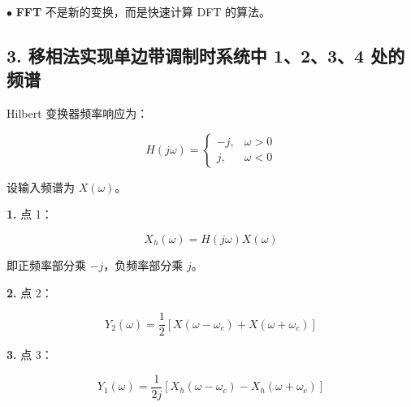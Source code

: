 \documentclass[11pt]{ctexart}
\begin{document}
\noindent\(\bullet\) \textbf{FFT} 不是新的变换，而是快速计算 DFT 的算法。\par



\subsection*{3. 移相法实现单边带调制时系统中 1、2、3、4 处的频谱}



Hilbert 变换器频率响应为：\par



\[

H(j\omega)=

\begin{cases}

-j, & \omega>0\\

j, & \omega<0

\end{cases}

\]



设输入频谱为 \(X(\omega)\)。\par



\noindent\textbf{1.} 点 1：\par



\[

   X_h(\omega)=H(j\omega)X(\omega)

   \]



即正频率部分乘 \(-j\)，负频率部分乘 \(j\)。\par



\noindent\textbf{2.} 点 2：\par



\[

   Y_2(\omega)=\frac12\left[X(\omega-\omega_c)+X(\omega+\omega_c)\right]

   \]



\noindent\textbf{3.} 点 3：\par



\[

   Y_1(\omega)=\frac{1}{2j}

   \left[X_h(\omega-\omega_c)-X_h(\omega+\omega_c)\right]

   \]
\end{document}
